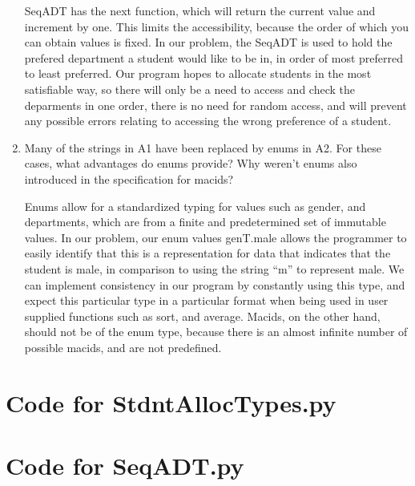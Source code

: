 \documentclass[12pt]{article}
\begin{document}
\begin{enumerate}[label=\alph*]
SeqADT has the next function, which will return the current value and increment by one. This limits the accessibility, because the order of which you can obtain values is fixed. In our problem, the SeqADT is used to hold the prefered department a student would like to be in, in order of most preferred to least preferred. Our program hopes to allocate students in the most satisfiable way, so there will only be a need to access and check the deparments in one order, there is no need for random access, and will prevent any possible errors relating to accessing the wrong preference of a student.

\item Many of the strings in A1 have been replaced by enums in A2. For these cases, what advantages do enums provide? Why weren't enums also introduced in the specification for macids?

Enums allow for a standardized typing for values such as gender, and departments, which are from a finite and predetermined set of immutable values. In our problem, our enum values genT.male allows the programmer to easily identify that this is a representation for data that indicates that the student is male, in comparison to using the string ``m'' to represent male. We can implement consistency in our program by constantly using this type, and expect this particular type in a particular format when being used in user supplied functions such as sort, and average. Macids, on the other hand, should not be of the enum type, because there is an almost infinite number of possible macids, and are not predefined.


\end{enumerate}

\newpage

\lstset{language=Python, basicstyle=\tiny, breaklines=true, showspaces=false,
  showstringspaces=false, breakatwhitespace=true}

\def\thesection{\Alph{section}}

\section{Code for StdntAllocTypes.py}

\noindent 

\newpage

\section{Code for SeqADT.py}
\end{document}
